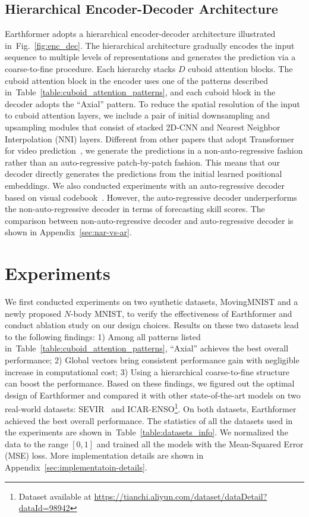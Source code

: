 \documentclass{article}
\newcommand{\tabref}[1]{Table~\ref{#1}}
\newcommand{\figref}[1]{Fig.~\ref{#1}}
\def\nbody{$N$-body MNIST}
\begin{document}
\subsection{Hierarchical Encoder-Decoder Architecture}
\label{sec:hierarchical_enc_dec}

Earthformer adopts a hierarchical encoder-decoder architecture illustrated in~\figref{fig:enc_dec}. The hierarchical architecture gradually encodes the input sequence to multiple levels of representations and generates the prediction via a coarse-to-fine procedure. Each hierarchy stacks $D$ cuboid attention blocks. The cuboid attention block in the encoder uses one of the patterns described in~\tabref{table:cuboid_attention_patterns}, and each cuboid block in the decoder adopts the ``Axial'' pattern. To reduce the spatial resolution of the input to cuboid attention layers, we include a pair of initial downsampling and upsampling modules that consist of stacked 2D-CNN and Nearest Neighbor Interpolation (NNI) layers.
Different from other papers that adopt Transformer for video prediction~\cite{ho2019axial, rakhimov2020latent}, we generate the predictions in a non-auto-regressive fashion rather than an auto-regressive patch-by-patch fashion. This means that our decoder directly generates the predictions from the initial learned positional embeddings. We also conducted experiments with an auto-regressive decoder based on visual codebook~\cite{razavi2019generating}. However, the auto-regressive decoder underperforms the non-auto-regressive decoder in terms of forecasting skill scores. The comparison between non-auto-regressive decoder and auto-regressive decoder is shown in Appendix~\ref{sec:nar-vs-ar}.

\section{Experiments}
We first conducted experiments on two synthetic datasets, MovingMNIST and a newly proposed \nbody{}, to verify the effectiveness of Earthformer and conduct ablation study on our design choices. Results on these two datasets lead to the following findings: 1) Among all patterns listed in~\tabref{table:cuboid_attention_patterns}, ``Axial'' achieves the best overall performance; 2) Global vectors bring consistent performance gain with negligible increase in computational cost; 3) Using a hierarchical coarse-to-fine structure can boost the performance.
Based on these findings, we figured out the optimal design of Earthformer and compared it with other state-of-the-art models
on two real-world datasets: SEVIR~\cite{veillette2020sevir} and ICAR-ENSO\footnote{Dataset available at \url{https://tianchi.aliyun.com/dataset/dataDetail?dataId=98942}}. On both datasets, Earthformer achieved the best overall performance. The statistics of all the datasets used in the experiments are shown in~\tabref{table:datasets_info}.
We normalized the data to the range $[0, 1]$ and trained all the models with the Mean-Squared Error (MSE) loss. More implementation details are shown in Appendix~\ref{sec:implementatoin-details}.
\end{document}
